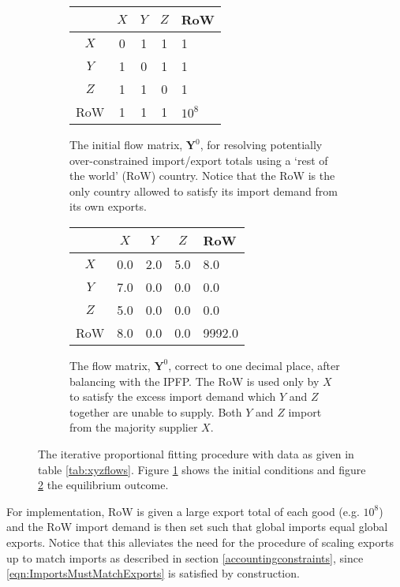 \documentclass[preprint,authoryear,3p]{elsarticle}
\begin{document}
\begin{figure}
\centering
\begin{subfigure}[t]{0.45\textwidth}
\centering
\begin{tabular}{ccccl}
\toprule
      & $X$ & $Y$ & $Z$ & RoW \\ \midrule 
$X$   &  0  &  1  &  1  &  1  \\
$Y$   &  1  &  0  &  1  &  1  \\
$Z$   &  1  &  1  &  0  &  1  \\
RoW   &  1  &  1  &  1  &  $10^8$  \\
\bottomrule
\end{tabular}
\caption{The initial flow matrix, $\textbf{Y}^0$, for resolving potentially over-constrained import/export totals using a `rest of the world' (RoW) country. Notice that the RoW is the only country allowed to satisfy its import demand from its own exports.}
\label{fig:ipfpexamplebefore}
\end{subfigure}
\qquad %
\begin{subfigure}[t]{0.45\textwidth}
\centering
\begin{tabular}{ccccl}
\toprule
      & $X$ & $Y$ & $Z$ & RoW \\ \midrule 
$X$   &  0.0  &  2.0  &  5.0  &  8.0  \\
$Y$   &  7.0  &  0.0  &  0.0  &  0.0  \\
$Z$   &  5.0  &  0.0  &  0.0  &  0.0  \\
RoW   &  8.0  &  0.0  &  0.0  &  9992.0  \\
\bottomrule
\end{tabular}
\caption{The flow matrix, $\textbf{Y}^0$, correct to one decimal place, after balancing with the IPFP. The RoW is used only by $X$ to satisfy the excess import demand which $Y$ and $Z$ together are unable to supply. Both $Y$ and $Z$ import from the majority supplier $X$.}
\label{fig:ipfpexampleafter}
\end{subfigure}
\caption{The iterative proportional fitting procedure with data as given in table \ref{tab:xyzflows}. Figure \ref{fig:ipfpexamplebefore} shows the initial conditions and figure \ref{fig:ipfpexampleafter} the equilibrium outcome.}
\label{fig:RoWexample}
\end{figure}

For implementation, RoW is given a large export total of each good (e.g. $10^8$) and the RoW import demand is then set such that global imports equal global exports. Notice that this alleviates the need for the procedure of scaling exports up to match imports as described in section \ref{accountingconstraints}, since \eqref{eqn:ImportsMustMatchExports} is satisfied by construction.
\end{document}
